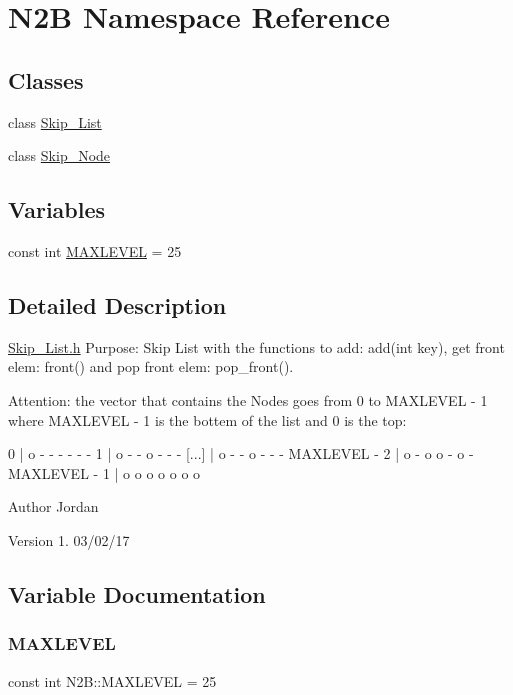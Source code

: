 \hypertarget{namespace_n2_b}{}\section{N2B Namespace Reference}
\label{namespace_n2_b}
\subsection*{Classes}
\begin{DoxyCompactItemize}
\item 
class \hyperlink{class_n2_b_1_1_skip___list}{Skip\+\_\+\+List}
\item 
class \hyperlink{class_n2_b_1_1_skip___node}{Skip\+\_\+\+Node}
\end{DoxyCompactItemize}
\subsection*{Variables}
\begin{DoxyCompactItemize}
\item 
const int \hyperlink{namespace_n2_b_a10312ffba548d1817a92781d4b23d2f3}{M\+A\+X\+L\+E\+V\+EL} = 25
\end{DoxyCompactItemize}


\subsection{Detailed Description}
\hyperlink{_skip___list_8h}{Skip\+\_\+\+List.\+h} Purpose\+: Skip List with the functions to add\+: add(int key), get front elem\+: front() and pop front elem\+: pop\+\_\+front().

Attention\+: the vector that contains the Nodes goes from 0 to M\+A\+X\+L\+E\+V\+EL -\/ 1 where M\+A\+X\+L\+E\+V\+EL -\/ 1 is the bottem of the list and 0 is the top\+:


\begin{DoxyPre}
 0              | o - - - - - -
 1              | o - - o - - -
 [...]          | o - - o - - -
 MAXLEVEL - 2   | o - o o - o -
 MAXLEVEL - 1   | o o o o o o o
\end{DoxyPre}


\begin{DoxyAuthor}{Author}
Jordan 
\end{DoxyAuthor}
\begin{DoxyVersion}{Version}
1. 03/02/17 
\end{DoxyVersion}


\subsection{Variable Documentation}
\mbox{\label{namespace_n2_b_a10312ffba548d1817a92781d4b23d2f3}} 
\subsubsection{\texorpdfstring{M\+A\+X\+L\+E\+V\+EL}{MAXLEVEL}}
{\footnotesize\ttfamily const int N2\+B\+::\+M\+A\+X\+L\+E\+V\+EL = 25}

